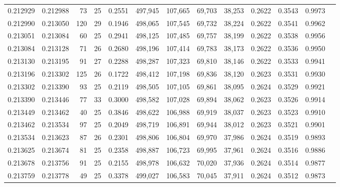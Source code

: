 \begin{tabular}{rrrrrrrrrrrrr}
0.212929 & 0.212988 &  73 &  25 &                                     0.2551 & 497,945 & 107,665 &  69,703 &  38,253 & 0.2622 & 0.3543 & 0.9973 \\
0.212990 & 0.213050 & 120 &  29 &                                     0.1946 & 498,065 & 107,545 &  69,732 &  38,224 & 0.2622 & 0.3541 & 0.9962 \\
0.213051 & 0.213084 &  60 &  25 &                                     0.2941 & 498,125 & 107,485 &  69,757 &  38,199 & 0.2622 & 0.3538 & 0.9956 \\
0.213084 & 0.213128 &  71 &  26 &                                     0.2680 & 498,196 & 107,414 &  69,783 &  38,173 & 0.2622 & 0.3536 & 0.9950 \\
0.213130 & 0.213195 &  91 &  27 &                                     0.2288 & 498,287 & 107,323 &  69,810 &  38,146 & 0.2622 & 0.3533 & 0.9941 \\
0.213196 & 0.213302 & 125 &  26 &                                     0.1722 & 498,412 & 107,198 &  69,836 &  38,120 & 0.2623 & 0.3531 & 0.9930 \\
0.213302 & 0.213390 &  93 &  25 &                                     0.2119 & 498,505 & 107,105 &  69,861 &  38,095 & 0.2624 & 0.3529 & 0.9921 \\
0.213390 & 0.213446 &  77 &  33 &                                     0.3000 & 498,582 & 107,028 &  69,894 &  38,062 & 0.2623 & 0.3526 & 0.9914 \\
0.213449 & 0.213462 &  40 &  25 &                                     0.3846 & 498,622 & 106,988 &  69,919 &  38,037 & 0.2623 & 0.3523 & 0.9910 \\
0.213462 & 0.213534 &  97 &  25 &                                     0.2049 & 498,719 & 106,891 &  69,944 &  38,012 & 0.2623 & 0.3521 & 0.9901 \\
0.213534 & 0.213623 &  87 &  26 &                                     0.2301 & 498,806 & 106,804 &  69,970 &  37,986 & 0.2624 & 0.3519 & 0.9893 \\
0.213625 & 0.213674 &  81 &  25 &                                     0.2358 & 498,887 & 106,723 &  69,995 &  37,961 & 0.2624 & 0.3516 & 0.9886 \\
0.213678 & 0.213756 &  91 &  25 &                                     0.2155 & 498,978 & 106,632 &  70,020 &  37,936 & 0.2624 & 0.3514 & 0.9877 \\
0.213759 & 0.213778 &  49 &  25 &                                     0.3378 & 499,027 & 106,583 &  70,045 &  37,911 & 0.2624 & 0.3512 & 0.9873 \\

\end{tabular}
